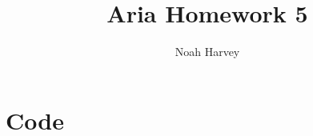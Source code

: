 \documentclass{report}
\begin{document}
\title{Aria Homework 5}
\author{Noah Harvey}
\maketitle
\chapter*{Code}



\end{document}
